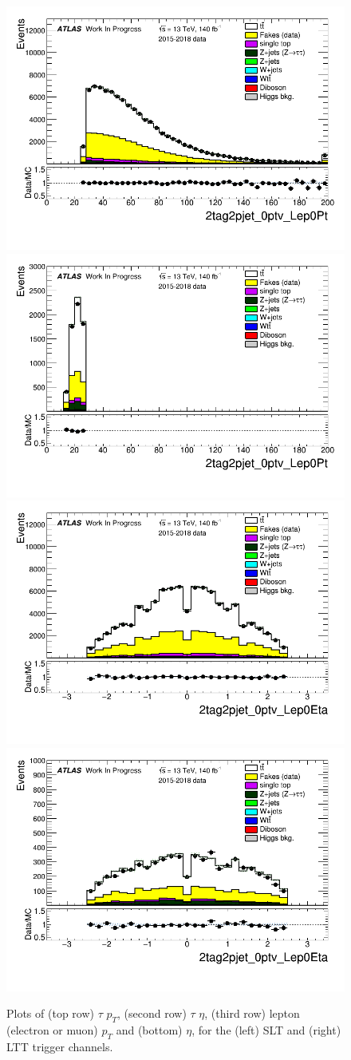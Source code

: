 \begin{figure}
\includegraphics[width=.45\textwidth]{figures/selection/LepHad_HH/2tag2pjet_0ptv_Lep0Pt_SR_ALLFAKES_SLT_ALL_NR_TRBins.png}
\includegraphics[width=.45\textwidth]{figures/selection/LepHad_HH/2tag2pjet_0ptv_Lep0Pt_SR_ALLFAKES_LTT_ALL_NR_TRBins.png} \\
\includegraphics[width=.45\textwidth]{figures/selection/LepHad_HH/2tag2pjet_0ptv_Lep0Eta_SR_ALLFAKES_SLT_ALL_NR_TRBins.png}
\includegraphics[width=.45\textwidth]{figures/selection/LepHad_HH/2tag2pjet_0ptv_Lep0Eta_SR_ALLFAKES_LTT_ALL_NR_TRBins.png} \\
\caption{Plots of (top row) $\tau$ $p_T$, (second row) $\tau$ $\eta$, (third row) lepton (electron or muon) $p_T$ and (bottom) $\eta$,  for the (left) SLT and (right) LTT trigger channels.}
\label{fig:lh_taulepsel}
\end{figure}


